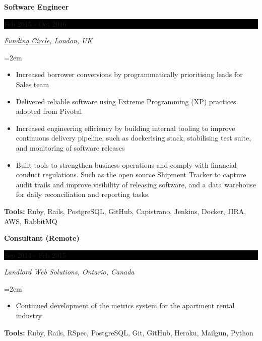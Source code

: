 \documentclass[paper=a4,fontsize=11pt]{scrartcl} %
\newcommand{\sepspace}{\vspace*{1em}}     %
\newcommand{\EducationEntry}[4]{
    \noindent \textbf{#1} \hfill        %
    \colorbox{Black}{
      \parbox{8.5em}{
      \hfill\color{White}#2}} \par      %
    \noindent \textit{#3} \par          %
    \noindent\hangindent=2em\hangafter=0 \small #4 %
    \normalsize \par}
\newcommand{\WorkEntry}[4]{             %
    \noindent \textbf{#1} \hfill        %
    \colorbox{Black}{%
      \parbox{9em}{%
      \hfill\color{White}#2}} \par      %
        \noindent \textit{#3} \par      %
    \noindent\hangindent=2em\hangafter=0 \small #4 %
    \normalsize \par}
\begin{document}
\WorkEntry{Software Engineer}{Feb 2015 - Oct 2016}
{\href{https://www.fundingcircle.com/}{Funding Circle}, London, UK}
{
 \begin{itemize} \itemsep -1pt
   \item Increased borrower conversions by programmatically prioritising leads for Sales team
   \item Delivered reliable software using Extreme Programming (XP) practices adopted from Pivotal %
   \item Increased engineering efficiency by building internal tooling to improve continuous delivery pipeline,
         such as dockerising stack, stabilising test suite, and monitoring of software releases
   \item Built tools to strengthen business operations and comply with financial conduct regulations.
         Such as the open source Shipment Tracker %
         to capture audit trails and improve visibility of releasing software,
         and a data warehouse for daily reconciliation and reporting tasks.
 \end{itemize}
 \textbf{Tools:} Ruby, Rails, PostgreSQL, GitHub, Capistrano, Jenkins, Docker, JIRA, AWS, RabbitMQ
}
\sepspace

\WorkEntry{Consultant (Remote)}{Sep 2014 - Feb 2015}
{Landlord Web Solutions, Ontario, Canada}
{
 \begin{itemize} \itemsep -1pt
   \item Continued development of the metrics system for the apartment rental industry
 \end{itemize}
 \textbf{Tools:} Ruby, Rails, RSpec, PostgreSQL, Git, GitHub, Heroku, Mailgun, Python
}
\sepspace
\end{document}
